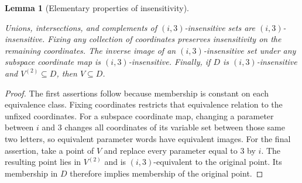 \documentclass[11pt]{amsart}
\newtheorem{lemma}[theorem]{Lemma}
\theoremstyle{definition}
\theoremstyle{remark}
\numberwithin{equation}{section}
\providecommand{\lean}[1]{}
\providecommand{\leanok}{}
\begin{document}
\begin{lemma}[Elementary properties of insensitivity]\label{cj:insensitive-facts}
\lean{Auto.cj_insensitive_facts_union,Auto.cj_insensitive_facts_inter,Auto.cj_insensitive_facts_compl,Auto.cj_insensitive_facts_fix,Auto.cj_insensitive_facts_preimage,Auto.cj_insensitive_facts_face}
\leanok
Unions, intersections, and complements of $(i,3)$-insensitive sets
are $(i,3)$-insensitive.  Fixing any collection of coordinates
preserves insensitivity on the remaining coordinates.  The inverse
image of an $(i,3)$-insensitive set under any subspace coordinate map
is $(i,3)$-insensitive.  Finally, if $D$ is $(i,3)$-insensitive and
$V^{(2)}\subseteq D$, then $V\subseteq D$.
\end{lemma}
\begin{proof}
The first assertions follow because membership is constant on each
equivalence class.  Fixing coordinates restricts that equivalence
relation to the unfixed coordinates.  For a subspace coordinate map,
changing a parameter between $i$ and $3$ changes all coordinates of
its variable set between those same two letters, so equivalent
parameter words have equivalent images.
For the final assertion, take a point of $V$ and replace every
parameter equal to $3$ by $i$.  The resulting point lies in
$V^{(2)}$ and is $(i,3)$-equivalent to the original point.  Its
membership in $D$ therefore implies membership of the original point.
\end{proof}
\end{document}
